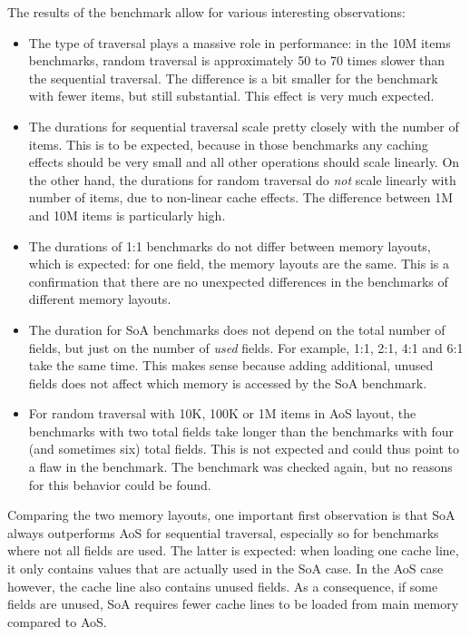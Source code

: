 \newpage

The results of the benchmark allow for various interesting observations:

\begin{itemize}
  \item The type of traversal plays a massive role in performance: in the 10M items benchmarks, random traversal is approximately 50 to 70 times slower than the sequential traversal.
  The difference is a bit smaller for the benchmark with fewer items, but still substantial.
  This effect is very much expected.
  \item The durations for sequential traversal scale pretty closely with the number of items.
  This is to be expected, because in those benchmarks any caching effects should be very small and all other operations should scale linearly.
  On the other hand, the durations for random traversal do \emph{not} scale linearly with number of items, due to non-linear cache effects.
  The difference between 1M and 10M items is particularly high.
  \item The durations of \textsf{1:1} benchmarks do not differ between memory layouts, which is expected: for one field, the memory layouts are the same.
  This is a confirmation that there are no unexpected differences in the benchmarks of different memory layouts.
  \item The duration for SoA benchmarks does not depend on the total number of fields, but just on the number of \emph{used} fields.
  For example, \textsf{1:1}, \textsf{2:1}, \textsf{4:1} and \textsf{6:1} take the same time.
  This makes sense because adding additional, unused fields does not affect which memory is accessed by the SoA benchmark.
  \item For random traversal with 10K, 100K or 1M items in AoS layout, the benchmarks with two total fields take longer than the benchmarks with four (and sometimes six) total fields.
  This is not expected and could thus point to a flaw in the benchmark.
  The benchmark was checked again, but no reasons for this behavior could be found.
\end{itemize}

Comparing the two memory layouts, one important first observation is that SoA always outperforms AoS for sequential traversal, especially so for benchmarks where not all fields are used.
The latter is expected: when loading one cache line, it only contains values that are actually used in the SoA case.
In the AoS case however, the cache line also contains unused fields.
As a consequence, if some fields are unused, SoA requires fewer cache lines to be loaded from main memory compared to AoS.


